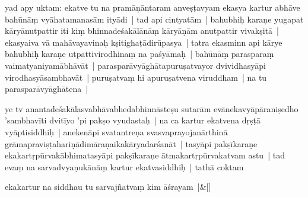 \documentclass[article,12pt,a4paper]{memoir}
\begin{document}
	  \pstart yad apy uktam: \label{ratnakīrtinibandhāvali__36r1NSAZOF4PYRJJ9T4KL5GNBA4}ekatve tu na pramāṇāntaram anveṣṭavyam ekasya kartur abhāve bahūnāṃ vyāhatamanasām ityādi\label{ratnakīrtinibandhāvali__36r1NSAZOF6VPMT1M1P47SSA79H} | \label{ratnakīrtinibandhāvali__36r1NMN5X0PC291R8Q4FO5BKCDN}tad api cintyatām | bahubhiḥ karaṇe yugapat kāryānutpattir iti kiṃ bhinnadeśakālānāṃ kāryāṇām anutpattir vivakṣitā | ekasyaiva vā mahāvayavinaḥ kṣitighaṭādirūpasya | tatra ekasminn api kārye bahubhiḥ karaṇe utpattivirodhinaṃ na paśyāmaḥ | bahūnāṃ parasparaṃ vaimatyaniyamābhāvāt | parasparāvyāghātapuruṣatvayor dvividhasyāpi virodhasyāsambhavāt | puruṣatvaṃ hi apuruṣatvena viruddham | na tu parasparāvyāghātena |
	\pend
      

	  \pstart ye tv anantadeśakālasvabhāvabhedabhinnāsteṣu sutarām evānekavyāpāraniṣedho 'sambhavīti dvitīyo 'pi pakṣo vyudastaḥ | na ca kartur ekatvena dṛṣṭā vyāptisiddhiḥ |  anekenāpi svatantreṇa svasvaprayojanārthinā grāmapraviṣṭahariṇādimāraṇaikakāryadarśanāt | tasyāpi pakṣīkaraṇe ekakartṛpūrvakābhimatasyāpi pakṣīkaraṇe ātmakartṛpūrvakatvam astu | tad evaṃ na sarvadvyaṇukānāṃ kartur ekatvasiddhiḥ | \label{ratnakīrtinibandhāvali__36r1NMMFX7IAGR5V3DIY9Q16BLF}tathā coktam
	\pend
      
	    
	    \stanza[\smallbreak]
	\label{ratnakīrtinibandhāvali__36r1NMFLFX785HFFPE2O9XY3QCP}ekakartur na siddhau tu sarvajñatvaṃ kim āśrayam |\label{ratnakīrtinibandhāvali__36r1NMFLNZF26QG3OB18MFYZVHQ}\&[\smallbreak]
\end{document}
